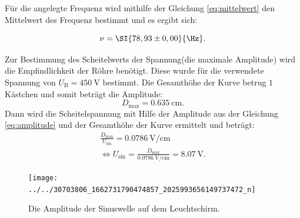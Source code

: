 Für die angelegte Frequenz wird mithilfe der Gleichung \ref{eq:mittelwert} den Mittelwert des Frequenz bestimmt und es ergibt sich:

\begin{equation}
\nu = \SI{78,93 \pm 0,00}{\Hz}.
\end{equation}

Zur Bestimmung des Scheitelwerts der Spannung(die maximale Amplitude) wird die Empfindlichkeit der Röhre benötigt. Diese wurde für die verwendete Spannung von $U_\text{B} = \SI{450}{\volt}$ bestimmt. Die Gesamthöhe der Kurve betrug $1$ Kästchen und somit beträgt die Amplitude:
\begin{equation}
\label{eq:amplitude}
D_\text{max} = \SI{0,635}{\cm}.
\end{equation}
Dann wird die Scheitelspannung mit Hilfe der Amplitude aus der Gleichung \ref{eq:amplitude} und der Gesamthöhe der Kurve ermittelt und beträgt:
\begin{align*}
\frac{D_\text{max}}{U_\text{sin}} = \SI{0,0786}{\volt\per\cm}\\
\Leftrightarrow U_\text{sin} = \frac{D_\text{max}}{\SI{0,0786}{\volt\per\cm}} = \SI{8,07}{\volt}.
\end{align*}

\begin{figure}[h!]
	\centering
	\texttt{[image: ../../30703806\_1662731790474857\_2025993656149737472\_n]}
	\caption{Die Amplitude der Sinuswelle auf dem Leuchtschirm.}
	\label{fig:3070380616627317904748572025993656149737472n}
\end{figure}

